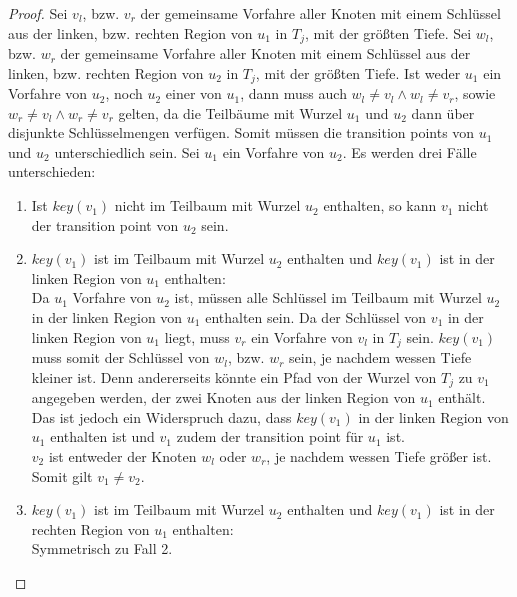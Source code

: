\documentclass[a4paper,12pt]{article}
\begin{document}
\begin{proof}
	Sei $v_l$, bzw. $v_r$ der gemeinsame Vorfahre aller Knoten mit einem Schlüssel aus der linken, bzw. rechten Region von $u_1$ in $T_j$, mit der größten Tiefe.  Sei $w_l$, bzw. $w_r$ der gemeinsame Vorfahre aller Knoten mit einem Schlüssel aus der linken, bzw. rechten Region von $u_2$ in $T_j$, mit der größten Tiefe. Ist weder $u_1$ ein Vorfahre von $u_2$, noch $u_2$ einer von $u_1$, dann muss auch $w_l \ne v_l \land w_l \ne v_r$, sowie $w_r \ne v_l \land w_r \ne v_r$ gelten, da die Teilbäume mit Wurzel $u_1$ und $u_2$ dann über disjunkte Schlüsselmengen verfügen. Somit müssen die transition points von $u_1$ und $u_2$ unterschiedlich sein. Sei $u_1$ ein Vorfahre von $u_2$. Es werden drei Fälle unterschieden:
	\begin{enumerate}
		\item Ist $\mathit{key}\left(v_1\right)$ nicht im Teilbaum mit Wurzel $u_2$ enthalten, so kann $v_1$ nicht der transition point von $u_2$ sein.
		\item $\mathit{key}\left(v_1\right)$ ist im Teilbaum mit Wurzel $u_2$ enthalten und $\mathit{key}\left(v_1\right)$ ist  in der linken Region von $u_1$ enthalten:\\
		Da $u_1$ Vorfahre von $u_2$ ist, müssen alle Schlüssel im Teilbaum mit Wurzel $u_2$ in der linken Region von $u_1$ enthalten sein. Da der Schlüssel von $v_1$ in der linken Region von $u_1$ liegt, muss $v_r$ ein Vorfahre von $v_l$ in $T_j$ sein. $\mathit{key}\left(v_1\right)$ muss somit der Schlüssel von $w_l$, bzw. $w_r$ sein, je nachdem wessen Tiefe kleiner ist. Denn andererseits könnte ein Pfad von der Wurzel von $T_j$ zu $v_1$ angegeben werden, der zwei Knoten aus der linken Region von $u_1$ enthält. Das ist jedoch ein Widerspruch dazu, dass  $\mathit{key}\left(v_1\right)$ in der linken Region von $u_1$ enthalten ist und $v_1$ zudem der transition point für $u_1$ ist.\\
		$v_2$ ist entweder der Knoten $w_l$ oder $w_r$, je nachdem wessen Tiefe größer ist. Somit gilt $v_1 \ne v_2$.
		\item $\mathit{key}\left(v_1\right)$ ist im Teilbaum mit Wurzel $u_2$ enthalten und $\mathit{key}\left(v_1\right)$ ist in der rechten Region von $u_1$ enthalten:\\
		Symmetrisch zu Fall 2.
	\end{enumerate}
	
	
	
	
	
	
\end{proof}
\end{document}
